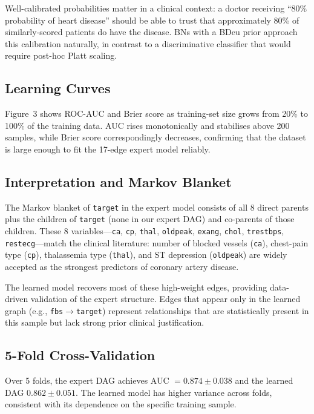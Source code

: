 \documentclass[10pt,twocolumn]{article}
\begin{document}
Well-calibrated probabilities matter in a clinical context: a doctor
receiving ``80\% probability of heart disease'' should be able to trust
that approximately 80\% of similarly-scored patients do have the disease.
BNs with a BDeu prior approach this calibration naturally, in contrast to
a discriminative classifier that would require post-hoc Platt scaling.

\subsection{Learning Curves}
Figure~3 shows ROC-AUC and Brier score as training-set size grows from 20\%
to 100\% of the training data. AUC rises monotonically and stabilises
above 200 samples, while Brier score correspondingly decreases, confirming
that the dataset is large enough to fit the 17-edge expert model reliably.

\subsection{Interpretation and Markov Blanket}
The Markov blanket of \texttt{target} in the expert model consists of all
8 direct parents plus the children of \texttt{target} (none in our expert
DAG) and co-parents of those children. These 8 variables---\texttt{ca},
\texttt{cp}, \texttt{thal}, \texttt{oldpeak}, \texttt{exang},
\texttt{chol}, \texttt{trestbps}, \texttt{restecg}---match the clinical
literature: number of blocked vessels (\texttt{ca}), chest-pain type
(\texttt{cp}), thalassemia type (\texttt{thal}), and ST depression
(\texttt{oldpeak}) are widely accepted as the strongest predictors
of coronary artery disease.

The learned model recovers most of these high-weight edges, providing
data-driven validation of the expert structure. Edges that appear only in
the learned graph (e.g., \texttt{fbs}$\to$\texttt{target}) represent
relationships that are statistically present in this sample but lack strong
prior clinical justification.

\subsection{5-Fold Cross-Validation}
Over 5 folds, the expert DAG achieves AUC $= 0.874 \pm 0.038$ and the
learned DAG $0.862 \pm 0.051$. The learned model has higher variance across
folds, consistent with its dependence on the specific training sample.
\end{document}
